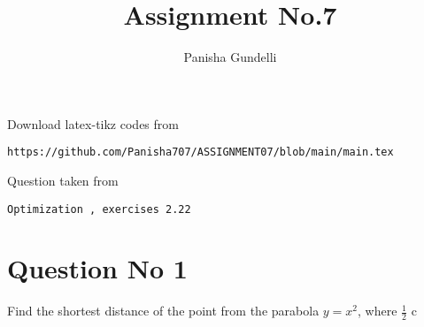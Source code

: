 \documentclass[journal,12pt,twocolumn]{IEEEtran}
\begin{document}
\makeatother
\let\StandardTheFigure\thefigure
\let\vec\mathbf
\renewcommand{\thefigure}{\theproblem}
\def\putbox#1#2#3{\makebox[0in][l]{\makebox[#1][l]{}\raisebox{\baselineskip}[0in][0in]{\raisebox{#2}[0in][0in]{#3}}}}
     \def\rightbox#1{\makebox[0in][r]{#1}}
     \def\centbox#1{\makebox[0in]{#1}}
     \def\topbox#1{\raisebox{-\baselineskip}[0in][0in]{#1}}
     \def\midbox#1{\raisebox{-0.5\baselineskip}[0in][0in]{#1}}
\vspace{3cm}
\title{Assignment No.7}
\author{Panisha Gundelli}
\maketitle
\newpage
\bigskip
\renewcommand{\thefigure}{\theenumi}
\renewcommand{\thetable}{\theenumi}
Download latex-tikz codes from
\begin{lstlisting}
https://github.com/Panisha707/ASSIGNMENT07/blob/main/main.tex
\end{lstlisting}
%
Question taken from
\begin{lstlisting}
Optimization , exercises 2.22
\end{lstlisting}
\section{Question No 1}
Find the shortest distance of the point  from
the parabola $y = x^2$, where $\frac{1}{2}$ \leq c 
\end{document}
